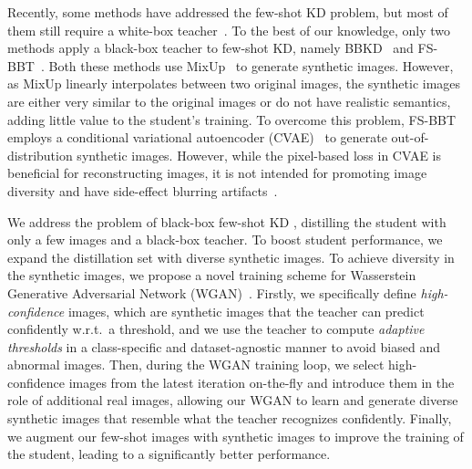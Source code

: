 \begin{foldable}
  Recently, some methods have addressed the few-shot \ac{KD} problem, but most of them still require a white-box teacher~\cite{kimura2018few,kong2020learning}.
  To the best of our knowledge, only two methods apply a black-box teacher to few-shot \ac{KD}, namely BBKD~\cite{wang2020neural} and FS-BBT~\cite{nguyen2022black}.
  Both these methods use MixUp~\cite{zhang2018mixup} to generate synthetic images.
  However, as MixUp linearly interpolates between two original images, the synthetic images are either very similar to the original images or do not have realistic semantics, adding little value to the student's training.
  To overcome this problem, FS-BBT employs a conditional variational autoencoder (CVAE)~\cite{sohn2015learning} to generate out-of-distribution synthetic images.
  However, while the pixel-based loss in CVAE is beneficial for reconstructing images, it is not intended for promoting image diversity and have side-effect blurring artifacts~\cite{bond2021deep}.
\end{foldable}

\begin{foldable}
  We address the problem of black-box few-shot \ac{KD} \ie, distilling the student with only a few images and a black-box teacher.
  To boost student performance, we expand the distillation set with diverse synthetic images.
  To achieve diversity in the synthetic images, we propose a novel training scheme for Wasserstein Generative Adversarial Network (WGAN)~\cite{arjovsky2017wasserstein}.
  Firstly, we specifically define \textit{high-confidence} images, which are synthetic images that the teacher can predict confidently w.r.t.\ a threshold, and we use the teacher to compute \textit{adaptive thresholds} in a class-specific and dataset-agnostic manner to avoid biased and abnormal images.
  Then, during the WGAN training loop, we select high-confidence images from the latest iteration on-the-fly and introduce them in the role of additional real images, allowing our WGAN to learn and generate diverse synthetic images that resemble what the teacher recognizes confidently.
  Finally, we augment our few-shot images with synthetic images to improve the training of the student, leading to a significantly better performance.
\end{foldable}

